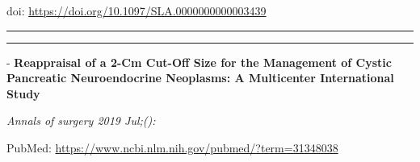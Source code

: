 \documentclass[]{article}
\begin{document}
doi: \url{https://doi.org/10.1097/SLA.0000000000003439}

{}

{}

\begin{center}\rule{0.5\linewidth}{\linethickness}\end{center}

\begin{center}\rule{0.5\linewidth}{\linethickness}\end{center}

 - \textbf{Reappraisal of a 2-Cm Cut-Off Size for the Management of
Cystic Pancreatic Neuroendocrine Neoplasms: A Multicenter International
Study}

\emph{Annals of surgery 2019 Jul;():}

PubMed: \url{https://www.ncbi.nlm.nih.gov/pubmed/?term=31348038}
\end{document}
